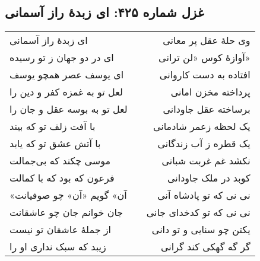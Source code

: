 \begin{center}
\section*{غزل شماره ۴۲۵: ای زبدهٔ راز آسمانی}
\label{sec:425}
\begin{longtable}{l p{0.5cm} r}
ای زبدهٔ راز آسمانی
&&
وی حلهٔ عقل پر معانی
\\
ای در دو جهان ز تو رسیده
&&
آوازهٔ کوس «لن ترانی»
\\
ای یوسف عصر همچو یوسف
&&
افتاده به دست کاروانی
\\
لعل تو به غمزه کفر و دین را
&&
پرداخته مخزن امانی
\\
لعل تو به بوسه عقل و جان را
&&
برساخته عقل جاودانی
\\
با آفت زلف تو که بیند
&&
یک لحظه زعمر شادمانی
\\
با آتش عشق تو که یابد
&&
یک قطره ز آب زندگانی
\\
موسی چکند که بی‌جمالت
&&
نکشد غم غربت شبانی
\\
فرعون که بود که با کمالت
&&
کوبد در ملک جاودانی
\\
«آن» گویم «آن» چو صوفیانت
&&
نی نی که تو پادشاه آنی
\\
جان خوانم جان چو عاشقانت
&&
نی نی که تو کدخدای جانی
\\
از جملهٔ عاشقان تو نیست
&&
یکتن چو سنایی و تو دانی
\\
زیبد که سبک نداری او را
&&
گر گه گهکی کند گرانی
\\
\end{longtable}
\end{center}
